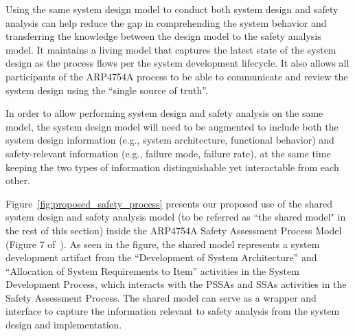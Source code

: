 Using the same system design model to conduct both system design and safety analysis can help reduce the gap in comprehending the system behavior and transferring the knowledge between the design model to the safety analysis model. It maintains a living model that captures the latest state of the system design as the process flows per the system development lifecycle.
It also allows all participants of the ARP4754A process to be able to communicate and review the system design using the ``single source of truth''.

In order to allow performing system design and safety analysis on the same model, the system design model will need to be augmented to include both the system design information (e.g., system architecture, functional behavior) and safety-relevant information (e.g., failure mode, failure rate), at the same time keeping the two types of information distinguishable yet interactable from each other.

Figure~\ref{fig:proposed_safety_process}   presents our proposed use of the shared system design and safety analysis model (to be referred as ``the shared model" in the rest of this section) inside the ARP4754A Safety Assessment Process Model (Figure 7 of~\cite{SAE:ARP4754A}). As seen in the figure, the shared model represents a system development artifact from the ``Development of System Architecture'' and ``Allocation of System Requirements to Item'' activities in the System Development Process, which interacts with the PSSAs and SSAs activities in the Safety Assessment Process. The shared model can serve as a wrapper and interface to capture the information relevant to safety analysis from the system design and implementation.

